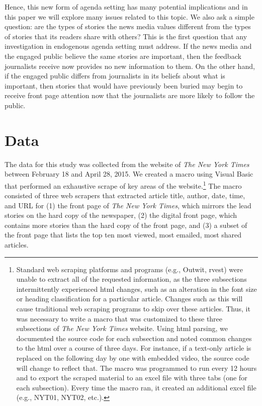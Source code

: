 \documentclass[12pt]{article}
\begin{document}
\begin{doublespace}
Hence, this new form of agenda setting has many potential implications and in this paper we will explore many issues related to this topic. We also ask a simple question: are the types of stories the news media values different from the types of stories that its readers share with others? This is the first question that any investigation in endogenous agenda setting must address. If the news media and the engaged public believe the same stories are important, then the feedback journalists receive now provides no new information to them. On the other hand, if the engaged public differs from journalists in its beliefs about what is important, then stories that would have previously been buried may begin to receive front page attention now that the journalists are more likely to follow the public.


\section{Data}

The data for this study was collected from the website of \textit{The New York Times} between February 18 and April 28, 2015. We created a macro using Visual Basic that performed an exhaustive scrape of key areas of the website.\footnote{Standard web scraping platforms and programs (e.g., Outwit, rvest) were unable to extract all of the requested information, as the three subsections intermittently experienced html changes, such as an alteration in the font size or heading classification for a particular article.  Changes such as this will cause traditional web scraping programs to skip over these articles. Thus, it was necessary to write a macro that was customized to these three subsections of \textit{The New York Times} website. Using html parsing, we documented the source code for each subsection and noted common changes to the html over a course of three days. For instance, if a text-only article is replaced on the following day by one with embedded video, the source code will change to reflect that. The macro was programmed to run every 12 hours and to export the scraped material to an excel file with three tabs (one for each subsection). Every time the macro ran, it created an additional excel file (e.g., NYT01, NYT02, etc.).} The macro consisted of three web scrapers that extracted article title, author, date, time, and URL for (1) the front page of \textit{The New York Times}, which mirrors the lead stories on the hard copy of the newspaper, (2) the digital front page, which contains more stories than the hard copy of the front page, and (3) a subset of the front page that lists the top ten most viewed, most emailed, most shared articles.


\end{doublespace}
\end{document}
